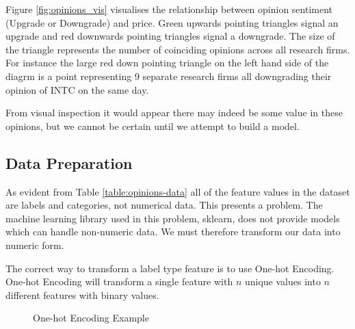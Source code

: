 \documentclass{report}
\begin{document}
Figure \ref{fig:opinions_vis} visualises the relationship between opinion sentiment (Upgrade or Downgrade) and price. Green upwards pointing triangles signal an upgrade and red downwards pointing triangles signal a downgrade. The size of the triangle represents the number of coinciding opinions across all research firms. For instance the large red down pointing triangle on the left hand side of the diagrm is a point representing 9 separate research firms all downgrading their opinion of INTC on the same day.

From visual inspection it would appear there may indeed be some value in these opinions, but we cannot be certain until we attempt to build a model.

\subsection{Data Preparation}

As evident from Table \ref{table:opinions-data} all of the feature values in the dataset are labels and categories, not numerical data. This presents a problem. The machine learning library used in this problem, sklearn, does not provide models which can handle non-numeric data. We must therefore transform our data into numeric form.

The correct way to transform a label type feature is to use One-hot Encoding. One-hot Encoding will transform a single feature with $n$ unique values into $n$ different features with binary values.

\begin{figure}[H]
\caption{One-hot Encoding Example}
\hfill
{}
\label{fig:one-hot}
\end{figure}
\end{document}

